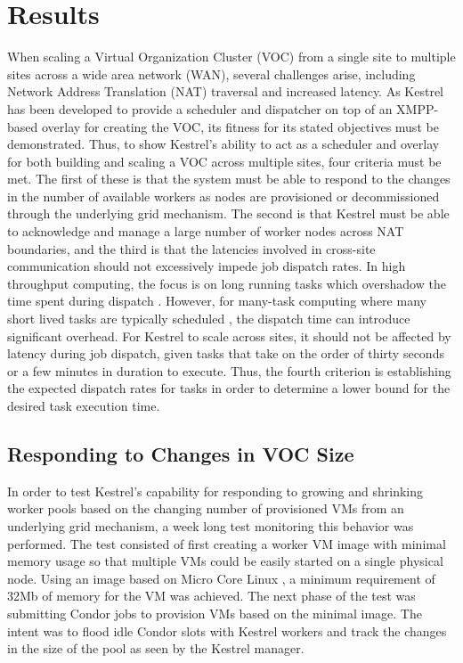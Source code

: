\chapter{Results}
\label{chap:Results}

When scaling a Virtual Organization Cluster (VOC)
\cite{Murphy2009,Murphy2009a,Murphy2010} from a single site to multiple sites
across a wide area network (WAN), several challenges arise, including Network
Address Translation (NAT) traversal and increased latency. As Kestrel has
been developed to provide a scheduler and dispatcher on top of an XMPP-based
overlay for creating the VOC, its fitness for its stated objectives must be
demonstrated. Thus, to show Kestrel's ability to act as a scheduler and overlay
for both building and scaling a VOC across multiple sites, four criteria
must be met. The first of these is that the system must be able to respond
to the changes in the number of available workers as nodes are provisioned
or decommissioned through the underlying grid mechanism. The second is that
Kestrel must be able to acknowledge and manage a large number of worker
nodes across NAT boundaries, and the third is that the latencies involved in
cross-site communication should not excessively impede job dispatch rates. In
high throughput computing, the focus is on long running tasks which overshadow
the time spent during dispatch \cite{Tannenbaum2001,DouglasThain2006}. However,
for many-task computing where many short lived tasks are typically scheduled
\cite{Raicu2008}, the dispatch time can introduce significant overhead. For
Kestrel to scale across sites, it should not be affected by latency during job
dispatch, given tasks that take on the order of thirty seconds or a few minutes
in duration to execute. Thus, the fourth criterion is establishing the expected
dispatch rates for tasks in order to determine a lower bound for the desired
task execution time.

\section{Responding to Changes in VOC Size}
\label{sec:Size-Changes}
In order to test Kestrel's capability for responding to growing and shrinking
worker pools based on the changing number of provisioned VMs from an underlying
grid mechanism, a week long test monitoring this behavior was performed. The test
consisted of first creating a worker VM image with minimal memory usage so that 
multiple VMs could be easily started on a single physical node. Using an image
based on Micro Core Linux \cite{MicroCoreLinux}, a minimum requirement of 32Mb
of memory for the VM was achieved. The next phase of the test was submitting
Condor jobs to provision VMs based on the minimal image. The intent was to flood
idle Condor slots with Kestrel workers and track the changes in the size of the
pool as seen by the Kestrel manager.

